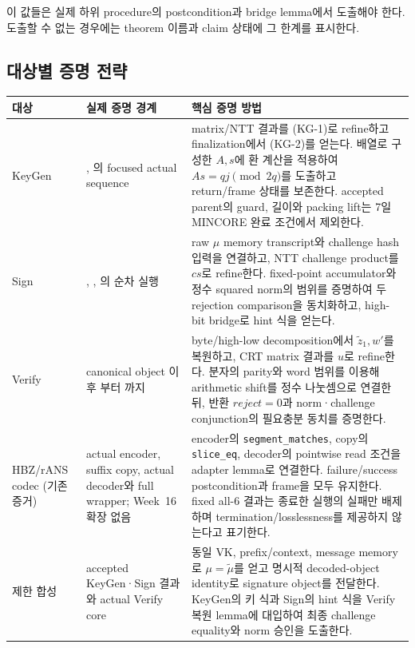 이 값들은 실제 하위 procedure의 postcondition과 bridge lemma에서 도출해야 한다.
도출할 수 없는 경우에는 theorem 이름과 claim 상태에 그 한계를 표시한다.

\subsection{대상별 증명 전략}

\begingroup
\small
\begin{longtable}{L{27mm}L{45mm}L{70mm}}
\toprule
대상 & 실제 증명 경계 & 핵심 증명 방법 \\
\midrule
\endhead
KeyGen &
, 의 focused actual sequence &
matrix/NTT 결과를 \textup{(KG-1)}로 refine하고 finalization에서
\textup{(KG-2)}를 얻는다. 배열로 구성한 \(A,s\)에 환 계산을 적용하여
\(As=qj\pmod{2q}\)를 도출하고 return/frame 상태를 보존한다. accepted parent의
guard, 길이와 packing lift는 7일 MINCORE 완료 조건에서 제외한다. \\
\addlinespace
Sign &
, ,
의 순차 실행 &
raw \(\mu\) memory transcript와 challenge hash 입력을 연결하고, NTT challenge
product를 \(cs\)로 refine한다. fixed-point accumulator와 정수 squared norm의
범위를 증명하여 두 rejection comparison을 동치화하고, high-bit bridge로 hint
식을 얻는다. \\
\addlinespace
Verify &
canonical object 이후 부터
까지 &
byte/high-low decomposition에서 \(\widetilde z_1,w'\)를 복원하고, CRT matrix
결과를 \(u\)로 refine한다. 분자의 parity와 word 범위를 이용해 arithmetic shift를
정수 나눗셈으로 연결한 뒤, 반환 \(reject=0\)과 norm·challenge conjunction의
필요충분 동치를 증명한다. \\
\addlinespace
HBZ/rANS codec (기존 증거) &
actual encoder, suffix copy, actual decoder와 full wrapper; Week~16 확장 없음 &
encoder의 \texttt{segment\_matches}, copy의 \texttt{slice\_eq}, decoder의
pointwise read 조건을 adapter lemma로 연결한다. failure/success postcondition과
frame을 모두 유지한다. fixed all-6 결과는 종료한 실행의 실패만 배제하며
termination/losslessness를 제공하지 않는다고 표기한다. \\
\addlinespace
제한 합성 &
accepted KeyGen·Sign 결과와 actual Verify core &
동일 VK, prefix/context, message memory로 \(\mu=\widetilde\mu\)를 얻고 명시적
decoded-object identity로 signature object를 전달한다. KeyGen의 키 식과 Sign의
hint 식을 Verify 복원 lemma에 대입하여 최종 challenge equality와 norm 승인을
도출한다. \\
\bottomrule
\end{longtable}
\endgroup

